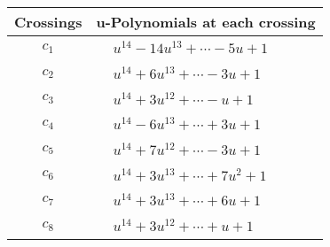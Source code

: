 \documentclass[1p]{elsarticle_modified}
\theoremstyle{definition}
\begin{document}
\begin{tabular}{m{50pt}|m{274pt}}
Crossings & \hspace{64pt}u-Polynomials at each crossing \\
\hline $$\begin{aligned}c_{1}\end{aligned}$$&$\begin{aligned}
&u^{14}-14 u^{13}+\cdots-5 u+1
\end{aligned}$\\
\hline $$\begin{aligned}c_{2}\end{aligned}$$&$\begin{aligned}
&u^{14}+6 u^{13}+\cdots-3 u+1
\end{aligned}$\\
\hline $$\begin{aligned}c_{3}\end{aligned}$$&$\begin{aligned}
&u^{14}+3 u^{12}+\cdots- u+1
\end{aligned}$\\
\hline $$\begin{aligned}c_{4}\end{aligned}$$&$\begin{aligned}
&u^{14}-6 u^{13}+\cdots+3 u+1
\end{aligned}$\\
\hline $$\begin{aligned}c_{5}\end{aligned}$$&$\begin{aligned}
&u^{14}+7 u^{12}+\cdots-3 u+1
\end{aligned}$\\
\hline $$\begin{aligned}c_{6}\end{aligned}$$&$\begin{aligned}
&u^{14}+3 u^{13}+\cdots+7 u^2+1
\end{aligned}$\\
\hline $$\begin{aligned}c_{7}\end{aligned}$$&$\begin{aligned}
&u^{14}+3 u^{13}+\cdots+6 u+1
\end{aligned}$\\
\hline $$\begin{aligned}c_{8}\end{aligned}$$&$\begin{aligned}
&u^{14}+3 u^{12}+\cdots+u+1
\end{aligned}$\\

\end{tabular}
\end{document}
